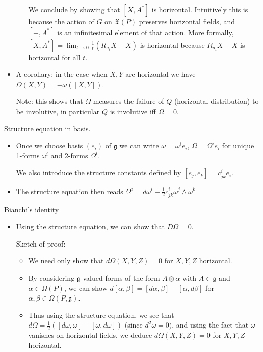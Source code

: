 \documentclass{report}
\theoremstyle{definition}
\begin{document}
\begin{itemize}
\begin{itemize}
        We conclude by showing that $[X,A^*]$ is horizontal. Intuitively this is because the action of $G$ on $\mathfrak{X}(P)$ preserves horizontal fields, and $[-,A^*]$ is an infinitesimal element of that action. More formally, $[X,A^*]=\lim_{t\to 0}\frac 1t (R_{a_t}X-X)$ is horizontal because $R_{a_t}X-X$ is horizontal for all $t$.
    \end{itemize}
    \item A corollary: in the case when $X,Y$ are horizontal we have $\Omega(X,Y)=-\omega([X,Y])$.

    Note: this shows that $\Omega$ measures the failure of $Q$ (horizontal distribution) to be involutive, in particular $Q$ is involutive iff $\Omega=0$.
\end{itemize}

Structure equation in basis.
\begin{itemize}
    \item Once we choose basis $(e_i)$ of $\mathfrak{g}$ we can write $\omega=\omega^ie_i$, $\Omega=\Omega^ie_i$ for unique 1-forms $\omega^i$ and 2-forms $\Omega^i$.

    We also introduce the structure constants defined by $[e_j,e_k]=c^i_{jk}e_i$.
    \item The structure equation then reads $\Omega^i=d\omega^i+\frac 12 c^i_{jk}\omega^j\wedge\omega^k$
\end{itemize}

Bianchi's identity
\begin{itemize}
    \item Using the structure equation, we can show that $D\Omega=0$.

    Sketch of proof:
    \begin{itemize}
        \item We need only show that $d\Omega(X,Y,Z)=0$ for $X,Y,Z$ horizontal.
        \item By considering $\mathfrak{g}$-valued forms of the form $A\otimes\alpha$ with $A\in\mathfrak{g}$ and $\alpha\in\Omega(P)$, we can show $d[\alpha,\beta]=[d\alpha,\beta]-[\alpha,d\beta]$ for $\alpha,\beta\in\Omega(P,\mathfrak{g})$.
        \item Thus using the structure equation, we see that $d\Omega=\frac12([d\omega,\omega]-[\omega,d\omega])$ (since $d^2\omega=0)$, and using the fact that $\omega$ vanishes on horizontal fields, we deduce $d\Omega(X,Y,Z)=0$ for $X,Y,Z$ horizontal.
    \end{itemize}
\end{itemize}
\end{document}
